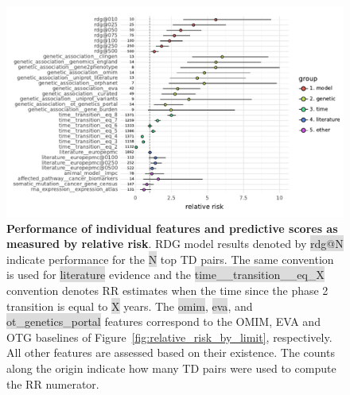 \documentclass{article}
\begin{document}
\pagebreak

\begin{figure}[H]
  \centering
  \captionsetup{width=.9\linewidth}
  \includegraphics[width=1\textwidth]{relative_risk_core_features.pdf}
  \caption{
    \textbf{Performance of individual features and predictive scores as measured by relative risk}.
    RDG model results denoted by \colorbox{Gainsboro}{rdg@N} indicate performance for the \colorbox{Gainsboro}{N} top TD pairs. The same convention is used for \colorbox{Gainsboro}{literature} evidence and the \colorbox{Gainsboro}{time\_\_transition\_\_eq\_X} convention denotes RR estimates when the time since the phase 2 transition is equal to \colorbox{Gainsboro}{X} years. The \colorbox{Gainsboro}{omim}, \colorbox{Gainsboro}{eva}, and \colorbox{Gainsboro}{ot\_genetics\_portal} features correspond to the OMIM, EVA and OTG baselines of Figure~\ref{fig:relative_risk_by_limit}, respectively. All other features are assessed based on their existence. The counts along the origin indicate how many TD pairs were used to compute the RR numerator.
  }
  \label{fig:relative_risk_core_features}
\end{figure}

\pagebreak
\end{document}
